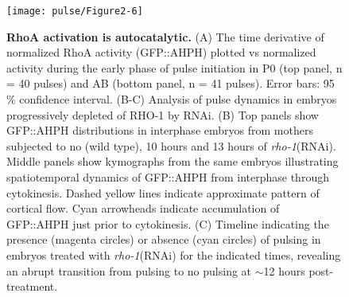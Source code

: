 \begin{figure}[!htbp]
\centering
\texttt{[image: pulse/Figure2-6]}

\caption{\label{fig:226}\textbf{RhoA activation is autocatalytic.} (A) The time derivative of normalized RhoA activity (GFP::AHPH) plotted vs normalized activity during the early phase of pulse initiation in P0 (top panel, n = 40 pulses) and AB (bottom panel, n = 41 pulses). Error bars: 95$\%$ confidence interval. (B-C) Analysis of pulse dynamics in embryos progressively depleted of RHO-1 by RNAi.  (B) Top panels show GFP::AHPH distributions in interphase embryos from mothers subjected to no (wild type), 10 hours and 13 hours of \textit{rho-1}(RNAi). Middle panels  show kymographs from the same embryos illustrating spatiotemporal dynamics of GFP::AHPH  from interphase through cytokinesis.  Dashed yellow lines indicate approximate pattern of cortical flow.  Cyan arrowheads indicate accumulation of GFP::AHPH just prior to cytokinesis.  (C) Timeline indicating the presence (magenta circles) or absence (cyan circles) of pulsing in embryos treated with \textit{rho-1}(RNAi) for the indicated times, revealing an abrupt transition from pulsing to no pulsing at $\sim$12 hours post-treatment.}
\end{figure}

